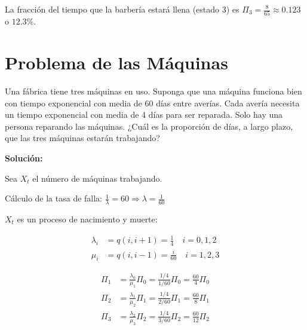 \documentclass{article}
\begin{document}
La fracción del tiempo que la barbería estará llena (estado 3) es $\Pi_3 = \frac{8}{65} \approx 0.123$ o $12.3\%$.

\section{Problema de las Máquinas}

Una fábrica tiene tres máquinas en uso. Suponga que una máquina funciona bien con tiempo exponencial con media de 60 días entre averías. Cada avería necesita un tiempo exponencial con media de 4 días para ser reparada. Solo hay una persona reparando las máquinas. ¿Cuál es la proporción de días, a largo plazo, que las tres máquinas estarán trabajando?

\textbf{Solución:}

Sea $X_t$ el número de máquinas trabajando.

Cálculo de la tasa de falla: $\frac{1}{\lambda} = 60 \Rightarrow \lambda = \frac{1}{60}$

\begin{center}
\end{center}

$X_t$ es un proceso de nacimiento y muerte:

\begin{align*}
\lambda_i &= q(i,i+1) = \frac{1}{4} \quad i=0,1,2 \\
\mu_i &= q(i,i-1) = \frac{i}{60} \quad i=1,2,3
\end{align*}

\begin{center}
\end{center}

\begin{align*}
\Pi_1 &= \frac{\lambda_0}{\mu_1} \Pi_0 = \frac{1/4}{1/60} \Pi_0 = \frac{60}{4} \Pi_0 \\
\Pi_2 &= \frac{\lambda_1}{\mu_2} \Pi_1 = \frac{1/4}{2/60} \Pi_1 = \frac{60}{8} \Pi_1 \\
\Pi_3 &= \frac{\lambda_2}{\mu_3} \Pi_2 = \frac{1/4}{3/60} \Pi_2 = \frac{60}{12} \Pi_2
\end{align*}
\end{document}
